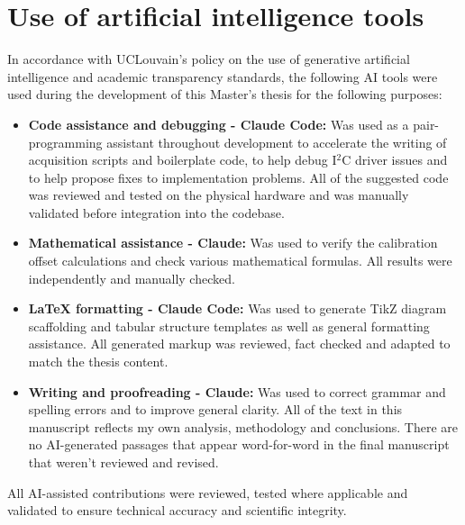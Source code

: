 ﻿\chapter{Use of artificial intelligence tools}
\label{ch:appendix-ai}

In accordance with UCLouvain's policy on the use of generative artificial intelligence and academic transparency standards, the following AI tools were used during the development of this Master's thesis for the following purposes:
\begin{itemize}
    \item \textbf{Code assistance and debugging - Claude Code:} Was used as a pair-programming assistant throughout development to accelerate the writing of acquisition scripts and boilerplate code, to help debug I$^2$C driver issues and to help propose fixes to implementation problems. All of the suggested code was reviewed and tested on the physical hardware and was manually validated before integration into the codebase.
    \item \textbf{Mathematical assistance - Claude:} Was used to verify the calibration offset calculations and check various mathematical formulas. All results were independently and manually checked.
    \item \textbf{LaTeX formatting - Claude Code:} Was used to generate TikZ diagram scaffolding and tabular structure templates as well as general formatting assistance. All generated markup was reviewed, fact checked and adapted to match the thesis content.
    \item \textbf{Writing and proofreading - Claude:} Was used to correct grammar and spelling errors and to improve general clarity. All of the text in this manuscript reflects my own analysis, methodology and conclusions. There are no AI-generated passages that appear word-for-word in the final manuscript that weren't reviewed and revised.
\end{itemize}
All AI-assisted contributions were reviewed, tested where applicable and validated to ensure technical accuracy and scientific integrity.
